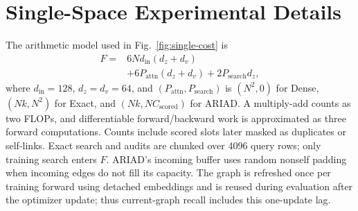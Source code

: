 \clearpage
\setcounter{page}{1}
\maketitlesupplementary

\section{Single-Space Experimental Details}
\label{sec:single-details}
The arithmetic model used in Fig.~\ref{fig:single-cost} is
\begin{align}
F={}&6N d_{\mathrm{in}}(d_z+d_v)\nonumber\\
 &+6P_{\mathrm{attn}}(d_z+d_v)+2P_{\mathrm{search}}d_z,
\end{align}
where $d_{\mathrm{in}}=128$, $d_z=d_v=64$, and $(P_{\mathrm{attn}},P_{\mathrm{search}})$ is $(N^2,0)$ for Dense, $(Nk,N^2)$ for Exact, and $(Nk,NC_{\mathrm{scored}})$ for ARIAD. A multiply-add counts as two FLOPs, and differentiable forward/backward work is approximated as three forward computations. Counts include scored slots later masked as duplicates or self-links. Exact search and audits are chunked over 4096 query rows; only training search enters $F$. ARIAD's incoming buffer uses random nonself padding when incoming edges do not fill its capacity. The graph is refreshed once per training forward using detached embeddings and is reused during evaluation after the optimizer update; thus current-graph recall includes this one-update lag.
